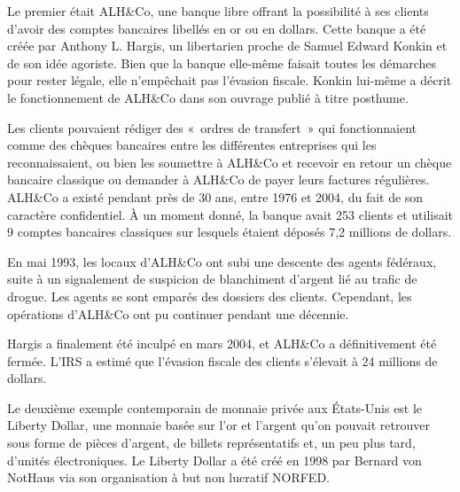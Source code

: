 
Le premier était ALH\&Co, une banque libre offrant la possibilité à ses clients d'avoir des comptes bancaires libellés en or ou en dollars. Cette banque a été créée par Anthony L. Hargis, un libertarien proche de Samuel Edward Konkin et de son idée agoriste. Bien que la banque elle-même faisait toutes les démarches pour rester légale, elle n'empêchait pas l'évasion fiscale. Konkin lui-même a décrit le fonctionnement de ALH\&Co dans son ouvrage  publié à titre posthume.

Les clients pouvaient rédiger des «~ordres de transfert~» qui fonctionnaient comme des chèques bancaires entre les différentes entreprises qui les reconnaissaient, ou bien les soumettre à ALH\&Co et recevoir en retour un chèque bancaire classique ou demander à ALH\&Co de payer leurs factures régulières. ALH\&Co a existé pendant près de 30 ans, entre 1976 et 2004, du fait de son caractère confidentiel. À un moment donné, la banque avait 253 clients et utilisait 9 comptes bancaires classiques sur lesquels étaient déposés 7,2 millions de dollars.

En mai 1993, les locaux d'ALH\&Co ont subi une descente des agents fédéraux, suite à un signalement de suspicion de blanchiment d'argent lié au trafic de drogue. Les agents se sont emparés des dossiers des clients. Cependant, les opérations d'ALH\&Co ont pu continuer pendant une décennie.

Hargis a finalement été inculpé en mars 2004, et ALH\&Co a définitivement été fermée. L'IRS a estimé que l'évasion fiscale des clients s'élevait à 24 millions de dollars.


Le deuxième exemple contemporain de monnaie privée aux États-Unis est le Liberty Dollar, une monnaie basée sur l'or et l'argent qu'on pouvait retrouver sous forme de pièces d'argent, de billets représentatifs et, un peu plus tard, d'unités électroniques. Le Liberty Dollar a été créé en 1998 par Bernard von NotHaus via son organisation à but non lucratif NORFED.

